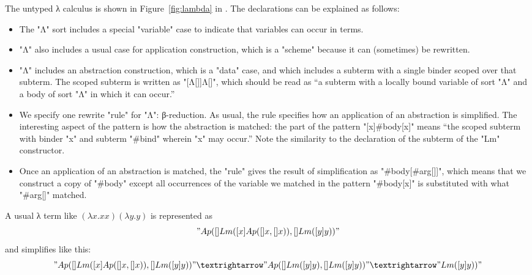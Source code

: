 \documentclass[letterpaper,11pt]{article}
\begin{document}
\begin{example}\label{ex:lambda}
  The untyped λ calculus is shown in Figure~\ref{fig:lambda} in \hax.  The declarations can be
  explained as follows:
  \begin{itemize}

  \item The "Λ" sort includes a special "variable" case to indicate that variables can occur in
    terms.

  \item "Λ" also includes a usual case for application construction, which is a "scheme" because it
    can (sometimes) be rewritten.

  \item "Λ" includes an abstraction construction, which is a "data" case, and which includes a
    subterm with a single binder scoped over that subterm. The scoped subterm is written as
    "[Λ[]]Λ[]", which should be read as ``a subterm with a locally bound variable of sort "Λ" and a
    body of sort "Λ" in which it can occur.''

  \item We specify one rewrite "rule" for "Λ": β-reduction. As usual, the rule specifies how an
    application of an abstraction is simplified. The interesting aspect of the pattern is how the
    abstraction is matched: the part of the pattern "[x]#body[x]" means ``the scoped subterm with
    binder "x" and subterm "#bind" wherein "x" may occur.'' Note the similarity to the declaration
    of the subterm of the "Lm" constructor.

  \item Once an application of an abstraction is matched, the "rule" gives the result of
    simplification as "#body[#arg[]]", which means that we construct a copy of "#body" except all
    occurrences of the variable we matched in the pattern "#body[x]" is substituted with what
    "#arg[]" matched.

  \end{itemize}
  A usual λ term like $(λx.x x)(λy.y)$ is represented as
  \begin{displaymath}
    "Ap([]Lm([x]Ap([]x, []x)), []Lm([y]y))"    
  \end{displaymath}
  and simplifies like this:
  \begin{displaymath}
    "Ap([]Lm([x]Ap([]x, []x)), []Lm([y]y))" →
    "Ap([]Lm([y]y), []Lm([y]y))" →
    "Lm([y]y))"
  \end{displaymath}
\end{example}
\end{document}
